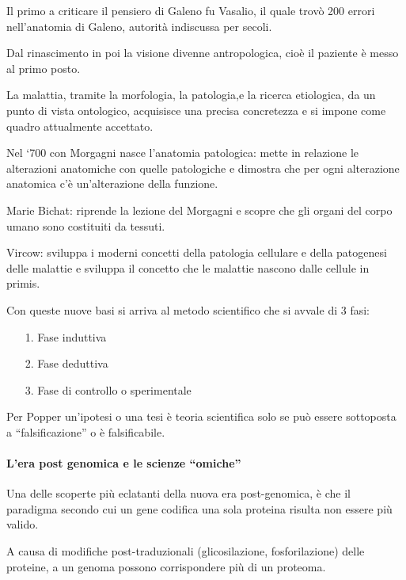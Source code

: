   Il primo a criticare il pensiero di Galeno fu Vasalio, il quale trovò
  200 errori nell'anatomia di Galeno, autorità indiscussa per secoli.

  Dal rinascimento in poi la visione divenne antropologica, cioè il
  paziente è messo al primo posto.

  La malattia, tramite la morfologia, la patologia,e la ricerca
  etiologica, da un punto di vista ontologico, acquisisce una precisa
  concretezza e si impone come quadro attualmente accettato.

  Nel `700 con Morgagni nasce l'anatomia patologica: mette in relazione
  le alterazioni anatomiche con quelle patologiche e dimostra che per
  ogni alterazione anatomica c'è un'alterazione della funzione.

  Marie Bichat: riprende la lezione del Morgagni e scopre che gli organi
  del corpo umano sono costituiti da tessuti.

  Vircow: sviluppa i moderni concetti della patologia cellulare e della
  patogenesi delle malattie e sviluppa il concetto che le malattie
  nascono dalle cellule in primis.

  Con queste nuove basi si arriva al metodo scientifico che si avvale di
  3 fasi:
\begin{itemize}

\item[1.]  Fase induttiva

\item[2.]  Fase deduttiva

\item[3.]  Fase di controllo o sperimentale

\end{itemize}

  Per Popper un'ipotesi o una tesi è teoria scientifica solo se può
  essere sottoposta a ``falsificazione'' o è falsificabile.

  \paragraph{L'era post genomica e le scienze ``omiche''}

  Una delle scoperte più eclatanti della nuova era post-genomica, è che
  il paradigma secondo cui un gene codifica una sola proteina risulta
  non essere più valido.

  A causa di modifiche post-traduzionali (glicosilazione,
  fosforilazione) delle proteine, a un genoma possono corrispondere più
  di un proteoma.

